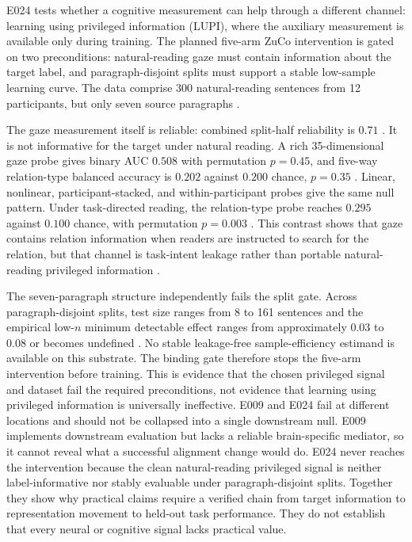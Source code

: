 E024 tests whether a cognitive measurement can help through a different channel: learning using privileged information (LUPI), where the auxiliary measurement is available only during training.
The planned five-arm ZuCo intervention is gated on two preconditions: natural-reading gaze must contain information about the target label, and paragraph-disjoint splits must support a stable low-sample learning curve.
The data comprise 300 natural-reading sentences from 12 participants, but only seven source paragraphs .

The gaze measurement itself is reliable: combined split-half reliability is $0.71$ .
It is not informative for the target under natural reading.
A rich 35-dimensional gaze probe gives binary AUC $0.508$ with permutation $p=0.45$, and five-way relation-type balanced accuracy is $0.202$ against $0.200$ chance, $p=0.35$ .
Linear, nonlinear, participant-stacked, and within-participant probes give the same null pattern.
Under task-directed reading, the relation-type probe reaches $0.295$ against $0.100$ chance, with permutation $p=0.003$ .
This contrast shows that gaze contains relation information when readers are instructed to search for the relation, but that channel is task-intent leakage rather than portable natural-reading privileged information .

The seven-paragraph structure independently fails the split gate.
Across paragraph-disjoint splits, test size ranges from 8 to 161 sentences and the empirical low-$n$ minimum detectable effect ranges from approximately $0.03$ to $0.08$ or becomes undefined .
No stable leakage-free sample-efficiency estimand is available on this substrate.
The binding gate therefore stops the five-arm intervention before training.
This is evidence that the chosen privileged signal and dataset fail the required preconditions, not evidence that learning using privileged information is universally ineffective.
E009 and E024 fail at different locations and should not be collapsed into a single downstream null.
E009 implements downstream evaluation but lacks a reliable brain-specific mediator, so it cannot reveal what a successful alignment change would do.
E024 never reaches the intervention because the clean natural-reading privileged signal is neither label-informative nor stably evaluable under paragraph-disjoint splits.
Together they show why practical claims require a verified chain from target information to representation movement to held-out task performance.
They do not establish that every neural or cognitive signal lacks practical value.

